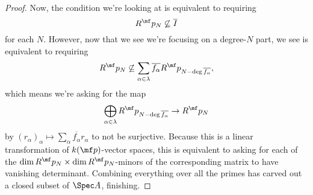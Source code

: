 \documentclass[../notes.tex]{subfiles}
\begin{document}
\begin{proof}
	Now, the condition we're looking at is equivalent to requiring
	\[R^\mf p_N\not\subseteq\overline I\]
	for each $N$. However, now that we see we're focusing on a degree-$N$ part, we see is equivalent to requiring
	\[R^\mf p_N\not\subseteq\sum_{\alpha\in\lambda}\overline{f_\alpha} R^\mf p_{N-\deg \overline{f_\alpha}},\]
	which means we're asking for the map
	\[\bigoplus_{\alpha\in\lambda}R^\mf p_{N-\deg \overline{f_\alpha}}\to R^\mf p_N\]
	by $(r_\alpha)_\alpha\mapsto\sum_\alpha \overline{f_\alpha} r_\alpha$ to not be surjective. Because this is a linear transformation of $k(\mf p)$-vector spaces, this is equivalent to asking for each of the $\dim R^\mf p_N\times\dim R^\mf p_N$-minors of the corresponding matrix to have vanishing determinant. Combining everything over all the primes has carved out a closed subset of $\Spec A$, finishing.\todo{}
\end{proof}

\end{document}
